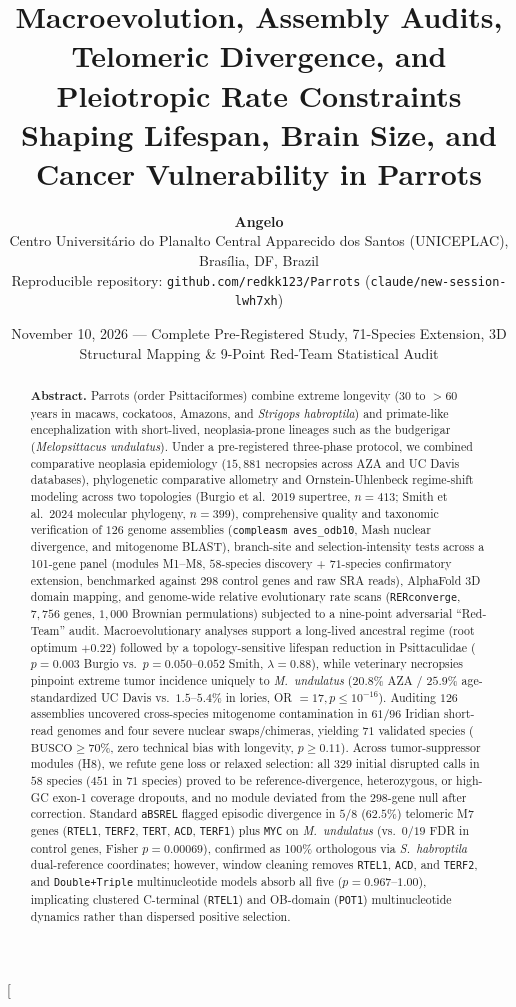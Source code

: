 \documentclass[10pt,a4paper,twocolumn]{article}
\title{\vspace{-0.8cm}\textbf{\Large Macroevolution, Assembly Audits, Telomeric Divergence, and Pleiotropic Rate Constraints Shaping Lifespan, Brain Size, and Cancer Vulnerability in Parrots}}
\author{
\textbf{Angelo}\\
\small Centro Universit\'ario do Planalto Central Apparecido dos Santos (UNICEPLAC), Bras\'ilia, DF, Brazil\\
\small Reproducible repository: \texttt{github.com/redkk123/Parrots} (\texttt{claude/new-session-lwh7xh})
}
\date{\small November 10, 2026 --- Complete Pre-Registered Study, 71-Species Extension, 3D Structural Mapping \& 9-Point Red-Team Statistical Audit}
\begin{document}
\twocolumn[{
  \begin{@twocolumnfalse}
    \maketitle
    \vspace{-0.4cm}
    \begin{abstract}
    \noindent \textbf{Abstract.} Parrots (order Psittaciformes) combine extreme longevity (30 to $>60$ years in macaws, cockatoos, Amazons, and \textit{Strigops habroptila}) and primate-like encephalization with short-lived, neoplasia-prone lineages such as the budgerigar (\textit{Melopsittacus undulatus}). Under a pre-registered three-phase protocol, we combined comparative neoplasia epidemiology ($15,881$ necropsies across AZA and UC Davis databases), phylogenetic comparative allometry and Ornstein-Uhlenbeck regime-shift modeling across two topologies (Burgio et al.\ 2019 supertree, $n = 413$; Smith et al.\ 2024 molecular phylogeny, $n = 399$), comprehensive quality and taxonomic verification of $126$ genome assemblies (\texttt{compleasm aves\_odb10}, Mash nuclear divergence, and mitogenome BLAST), branch-site and selection-intensity tests across a 101-gene panel (modules M1--M8, $58$-species discovery + $71$-species confirmatory extension, benchmarked against $298$ control genes and raw SRA reads), AlphaFold 3D domain mapping, and genome-wide relative evolutionary rate scans (\texttt{RERconverge}, $7,756$ genes, $1,000$ Brownian permulations) subjected to a nine-point adversarial ``Red-Team'' audit. Macroevolutionary analyses support a long-lived ancestral regime (root optimum $+0.22$) followed by a topology-sensitive lifespan reduction in Psittaculidae ($p = 0.003$ Burgio vs.\ $p = 0.050$--$0.052$ Smith, $\lambda = 0.88$), while veterinary necropsies pinpoint extreme tumor incidence uniquely to \textit{M.\ undulatus} ($20.8\%$ AZA / $25.9\%$ age-standardized UC Davis vs.\ $1.5$--$5.4\%$ in lories, OR $= 17, p \le 10^{-16}$). Auditing $126$ assemblies uncovered cross-species mitogenome contamination in $61/96$ Iridian short-read genomes and four severe nuclear swaps/chimeras, yielding $71$ validated species ($\text{BUSCO} \ge 70\%$, zero technical bias with longevity, $p \ge 0.11$). Across tumor-suppressor modules (H8), we refute gene loss or relaxed selection: all $329$ initial disrupted calls in $58$ species ($451$ in $71$ species) proved to be reference-divergence, heterozygous, or high-GC exon-1 coverage dropouts, and no module deviated from the $298$-gene null after correction. Standard \texttt{aBSREL} flagged episodic divergence in $5/8$ ($62.5\%$) telomeric M7 genes (\texttt{RTEL1}, \texttt{TERF2}, \texttt{TERT}, \texttt{ACD}, \texttt{TERF1}) plus \texttt{MYC} on \textit{M.\ undulatus} (vs.\ $0/19$ FDR in control genes, Fisher $p = 0.00069$), confirmed as 100\% orthologous via \textit{S.\ habroptila} dual-reference coordinates; however, window cleaning removes \texttt{RTEL1}, \texttt{ACD}, and \texttt{TERF2}, and \texttt{Double+Triple} multinucleotide models absorb all five ($p = 0.967$--$1.00$), implicating clustered C-terminal (\texttt{RTEL1}) and OB-domain (\texttt{POT1}) multinucleotide dynamics rather than dispersed positive selection. 
\end{abstract}
\end{@twocolumnfalse}}
\end{document}
